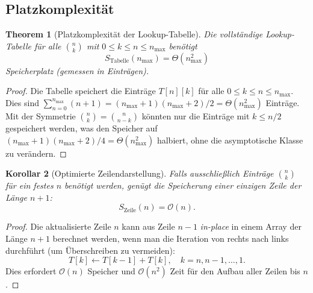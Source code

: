 ﻿\documentclass[12pt, a4paper]{article}
\newcommand{\Oh}{\mathcal{O}}
\theoremstyle{plain}
\newtheorem{theorem}{Theorem}[section]
\newtheorem{korollar}[theorem]{Korollar}
\theoremstyle{definition}
\theoremstyle{remark}
\renewcommand{\Oh}{\mathcal{O}}
\begin{document}
\subsection{Platzkomplexität}

\begin{theorem}[Platzkomplexität der Lookup-Tabelle]
  \label{thm:platz}
  Die vollständige Lookup-Tabelle für alle $\binom{n}{k}$ mit
  $0 \le k \le n \le n_{\max}$ benötigt
  \begin{equation}
    S_{\text{Tabelle}}(n_{\max}) = \Theta(n_{\max}^2)
    \label{eq:platz_tabelle}
  \end{equation}
  Speicherplatz (gemessen in Einträgen).
\end{theorem}

\begin{proof}
  Die Tabelle speichert die Einträge $T[n][k]$ für alle
  $0 \le k \le n \le n_{\max}$. Dies sind
  $\sum_{n=0}^{n_{\max}}(n+1) = (n_{\max}+1)(n_{\max}+2)/2 = \Theta(n_{\max}^2)$
  Einträge. Mit der Symmetrie $\binom{n}{k} = \binom{n}{n-k}$
  könnten nur die Einträge mit $k \le n/2$ gespeichert werden,
  was den Speicher auf $(n_{\max}+1)(n_{\max}+2)/4 = \Theta(n_{\max}^2)$
  halbiert, ohne die asymptotische Klasse zu verändern.
\end{proof}

\begin{korollar}[Optimierte Zeilendarstellung]
  \label{kor:zeile_platz}
  Falls ausschließlich Einträge $\binom{n}{k}$ für ein festes $n$ benötigt
  werden, genügt die Speicherung einer einzigen Zeile der Länge $n+1$:
  \begin{equation}
    S_{\text{Zeile}}(n) = \Oh(n).
  \end{equation}
\end{korollar}

\begin{proof}
  Die aktualisierte Zeile $n$ kann aus Zeile $n-1$ \emph{in-place}
  in einem Array der Länge $n+1$ berechnet werden, wenn man die
  Iteration von rechts nach links durchführt (um Überschreiben zu vermeiden):
  \begin{equation}
    T[k] \leftarrow T[k-1] + T[k], \quad k = n, n-1, \ldots, 1.
  \end{equation}
  Dies erfordert $\Oh(n)$ Speicher und $\Oh(n^2)$ Zeit für den
  Aufbau aller Zeilen bis $n$.
\end{proof}
\end{document}
